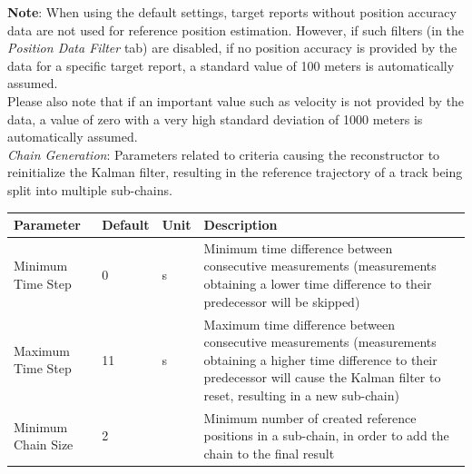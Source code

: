 \textbf{Note}: When using the default settings, target reports without position accuracy data are not used for reference position estimation. However, if such filters (in the \textit{Position Data Filter} tab) are disabled, if no position accuracy is provided by the data for a specific target report, a standard value of 100 meters is automatically assumed. \\

Please also note that if an important value such as velocity is not provided by the data, a value of zero with a very high standard deviation of 1000 meters is automatically assumed. \\

\textit{Chain Generation}: Parameters related to criteria causing the reconstructor to reinitialize the Kalman filter, 
resulting in the reference trajectory of a track being split into multiple sub-chains.
\begin{table}[H]
    \center
    \begin{tabularx}{\textwidth}{ | l | l | l | X |}
        \hline
        \textbf{Parameter} & \textbf{Default} & \textbf{Unit} & \textbf{Description} \\ \hline
        Minimum Time Step & 0 & s & Minimum time difference between consecutive measurements (measurements obtaining a 
            lower time difference to their predecessor will be skipped) \\ \hline
        Maximum Time Step & 11 & s & Maximum time difference between consecutive measurements (measurements obtaining a 
            higher time difference to their predecessor will cause the Kalman filter to reset, 
            resulting in a new sub-chain) \\ \hline
        Minimum Chain Size & 2 & & Minimum number of created reference positions in a sub-chain, in order to add the chain 
            to the final result \\ \hline
    \end{tabularx}
\end{table}

